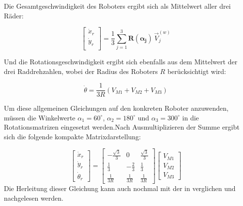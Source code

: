 Die Gesamtgeschwindigkeit des Roboters ergibt sich als Mittelwert aller drei Räder:

\begin{equation}
\begin{bmatrix}
\dot{x}_r \\
\dot{y}_r \\
\end{bmatrix}
=
\frac{1}{3} \sum_{j=1}^{3}
\mathbf{R(\alpha_j)}\,\vec{V}_j^{(w)}
\end{equation}

Und die Rotationsgeschwindigkeit ergibt sich ebenfalls aus dem Mittelwert der drei Raddrehzahlen, wobei der Radius des Roboters $R$ berücksichtigt wird:

\begin{equation}
\dot{\theta} = \frac{1}{3R}(V_{M1} + V_{M2} + V_{M3})
\end{equation}

Um diese allgemeinen Gleichungen auf den konkreten Roboter anzuwenden, müssen die Winkelwerte $\alpha_1 = 60^\circ$, $\alpha_2 = 180^\circ$ und $\alpha_3 = 300^\circ$ in die Rotationsmatrizen eingesetzt werden.Nach Ausmultiplizieren der Summe ergibt sich die folgende kompakte Matrixdarstellung:

\begin{equation}
    \begin{bmatrix}
        \dot{x}_r \\
        \dot{y}_r\\
        \dot{\theta}_r
    \end{bmatrix}
    =
    \begin{bmatrix}
        -\frac{\sqrt{3}}{3} & 0 & \frac{\sqrt{3}}{3} \\
		\frac{1}{3} & -\frac{2}{3} & \frac{1}{3} \\
		\frac{1}{3R} & \frac{1}{3R} & \frac{1}{3R}
    \end{bmatrix}
    \begin{bmatrix}
        V_{M1} \\
        V_{M2} \\
        V_{M3}
    \end{bmatrix}
    \label{eq:Vorwärtsmatrix}
\end{equation}
Die Herleitung dieser Gleichung kann auch nochmal mit der in \cite{Hacene2019} verglichen und nachgelesen werden.\\

